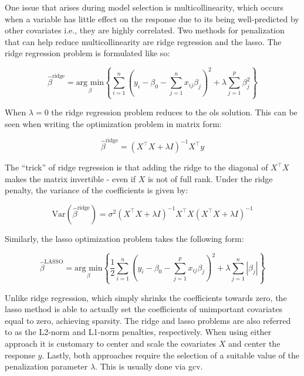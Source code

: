 \documentclass{report}
\begin{document}
One issue that arises during model selection is multicollinearity, which occurs when a variable has little effect on the response due to its being well-predicted by other covariates i.e., they are highly correlated. Two methods for penalization that can help reduce multicollinearity are ridge regression and the \gls{lasso}. The ridge regression problem is formulated like so:

\begin{equation}\label{eq:ols-ridge-regressor-lagrangian}
    \hat{\beta}^{\text{ridge}} = \underset{\beta}{\text{arg min}} \left\{\sum_{i=1}^n \left(y_i - \beta_0 - \sum_{j=1}^n x_{ij} \beta_j\right)^2 + \lambda \sum_{j=1}^p \beta_j^2\right\}
\end{equation}

When $\lambda = 0$ the ridge regression problem reduces to the \gls{ols} solution. This can be seen when writing the optimization problem in matrix form:

\begin{equation}\label{eq:ols-ridge-regressor-matrix}
    \hat{\beta}^{\text{ridge}} = \left(X^\intercal X + \lambda I\right)^{-1}X^\intercal y
\end{equation}

The ``trick'' of ridge regression is that adding the ridge to the diagonal of $X^\intercal X$ makes the matrix invertible - even if $X$ is not of full rank. Under the ridge penalty, the variance of the coefficients is given by:

\begin{equation}\label{eq:ridge-coef-variance}
    \text{Var}\left(\hat{\beta}^{\text{ridge}}\right) = \sigma^2\left(X^\intercal X + \lambda I\right)^{-1} X^\intercal X \left(X^\intercal X + \lambda I\right)^{-1}
\end{equation}

Similarly, the \gls{lasso} optimization problem takes the following form:

\begin{equation}\label{eq:lasso-regressor-lagrangian}
    \hat{\beta}^{\text{LASSO}} = \underset{\beta}{\text{arg min}} \left\{\frac{1}{2} \sum_{i=1}^n \left(y_i - \beta_0 - \sum_{j=1}^p x_{ij} \beta_j\right)^2 + \lambda \sum_{j=1}^n |\beta_j|\right\}
\end{equation}

Unlike ridge regression, which simply shrinks the coefficients towards zero, the \gls{lasso} method is able to actually set the coefficients of unimportant covariates equal to zero, achieving sparsity. The ridge and \gls{lasso} problems are also referred to as the L2-norm and L1-norm penalties, respectively. When using either approach it is customary to center and scale the covariates $X$ and center the response $y$. Lastly, both approaches require the selection of a suitable value of the penalization parameter $\lambda$. This is usually done via \gls{gcv}. 
\end{document}
